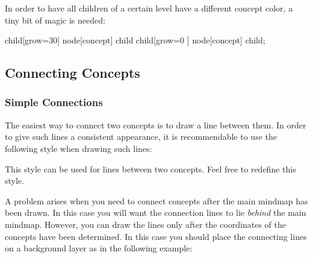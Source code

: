 \begin{itemize}
  In order to have all children of a certain level have a different
  concept color, a tiny bit of magic is needed:
\begin{codeexample}[]
\tikz[mindmap,text=white,
      root concept/.style={concept color=blue},
      level 1 concept/.append style=
        {every child/.style={concept color=blue!50}}]
    child[grow=30] {node[concept] {child}}
    child[grow=0 ] {node[concept] {child}};
\end{codeexample}
\end{itemize}

\subsection{Connecting Concepts}

\subsubsection{Simple Connections}

The easiest way to connect two concepts is to draw a line between
them. In order to give such lines a consistent appearance, it is
recommendable to use the following style when drawing such lines:

\begin{itemize}
  This style can be used for lines between two concepts. Feel free to
  redefine this style.
\end{itemize}

A problem arises when you need to connect concepts after the main
mindmap has been drawn. In this case you will want the connection
lines to lie \emph{behind} the main mindmap. However, you can draw the
lines only after the coordinates of the concepts have been
determined. In this case you should place the connecting lines on a
background layer as in the following example:

\begin{codeexample}[]
\end{codeexample}


